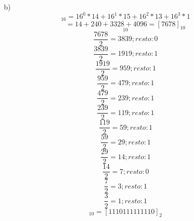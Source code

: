 \documentclass{article}
\begin{document}
\begin{enumerate}
    \item[b)] \begin{equation*} [1DFE]_{16} = 16^{0} * 14 + 16^{1} * 15 + 16^{2} * 13 + 16^{3} * 1\end{equation*} \begin{equation*} = 14 + 240 + 3328 + 4096 = [7678]_{10}\end{equation*} \begin{equation*}[7678]_{10}\end{equation*}\begin{equation*} \frac{7678}{2} =  3839;  resto: 0\end{equation*}\begin{equation*} \frac{3839}{2} =  1919;  resto: 1\end{equation*}\begin{equation*} \frac{1919}{2} =  959;  resto: 1\end{equation*}\begin{equation*} \frac{959}{2} =  479;  resto: 1\end{equation*}\begin{equation*} \frac{479}{2} =  239;  resto: 1\end{equation*}\begin{equation*} \frac{239}{2} =  119;  resto: 1\end{equation*}\begin{equation*} \frac{119}{2} =  59;  resto: 1\end{equation*}\begin{equation*} \frac{59}{2} =  29;  resto: 1\end{equation*}\begin{equation*} \frac{29}{2} =  14;  resto: 1\end{equation*}\begin{equation*} \frac{14}{2} =  7;  resto: 0\end{equation*}\begin{equation*} \frac{7}{2} =  3;  resto: 1\end{equation*}\begin{equation*} \frac{3}{2} =  1;  resto: 1\end{equation*}\begin{equation*}[7678]_{10} = [1110111111110]_{2}\end{equation*}

\end{enumerate}
\end{document}
